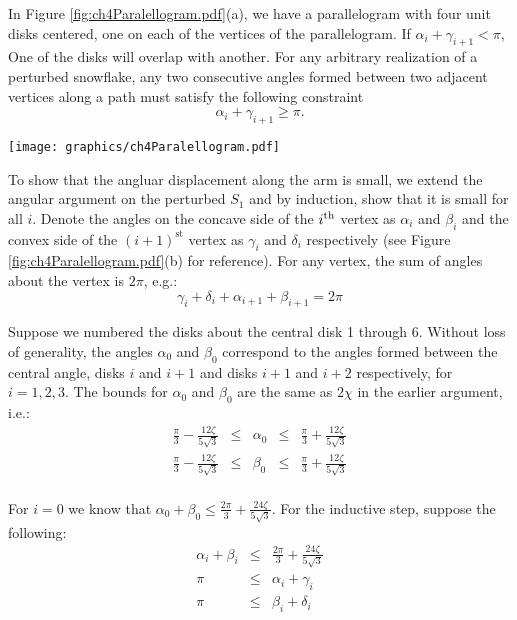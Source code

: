 In Figure \ref{fig:ch4Paralellogram.pdf}(a), we have a parallelogram with four unit disks centered, one on each of the vertices of the parallelogram.  
If $\alpha_i + \gamma_{i+1} < \pi$, One of the disks will overlap with another.  
For any arbitrary realization of a perturbed snowflake, any two consecutive angles formed between two adjacent vertices along a path must satisfy the following constraint $$\alpha_i + \gamma_{i+1} \geq \pi.$$

\begin{minipage}{\linewidth}
\begin{center}
\texttt{[image: graphics/ch4Paralellogram.pdf]}
\label{fig:ch4Paralellogram.pdf}
\end{center}
\end{minipage}

To show that the angluar displacement along the arm is small, we extend the angular argument on the perturbed $S_1$ and by induction, show that it is small for all $i$.  
Denote the angles on the concave side of the $i^\text{th}$ vertex as $\alpha_i$ and $\beta_i$ and the convex side of the $(i+1)^\text{st}$ vertex as $\gamma_i$ and $\delta_i$ respectively (see Figure \ref{fig:ch4Paralellogram.pdf}(b) for reference). 
For any vertex, the sum of angles about the vertex is $2 \pi$, e.g.:
$$\gamma_i + \delta_i + \alpha_{i+1} + \beta_{i+1} = 2 \pi$$ 

Suppose we numbered the disks about the central disk 1 through 6.  
Without loss of generality, the angles $\alpha_0$ and $\beta_0$ correspond to the angles formed between the central angle, disks $i$ and $i+1$ and disks $i+1$ and $i+2$ respectively, for $i = 1,2,3$.  
The bounds for $\alpha_0$ and $\beta_0$ are the same as $2\chi$ in the earlier argument, i.e.:
$$
\begin{array}{rcccl}
\frac{\pi}{3} - \frac{12 \zeta}{5\sqrt{3}} &\leq& \alpha_0 &\leq& \frac{\pi}{3} + \frac{12 \zeta}{5\sqrt{3}}\\
\frac{\pi}{3} - \frac{12 \zeta}{5\sqrt{3}} &\leq& \beta_0 &\leq& \frac{\pi}{3} + \frac{12 \zeta}{5\sqrt{3}}\\
\end{array}
$$

For $i=0$ we know that $\alpha_0 + \beta_0 \leq \frac{2\pi}{3} + \frac{24 \zeta}{5\sqrt{3}}.$
For the inductive step, suppose the following:
$$
\begin{array}{rcl}
\alpha_i +\beta_i &\leq& \frac{2 \pi}{3} + \frac{24 \zeta}{5\sqrt3}\\
\pi &\leq& \alpha_i + \gamma_i \\
\pi &\leq& \beta_i + \delta_i
\end{array}
$$ 

